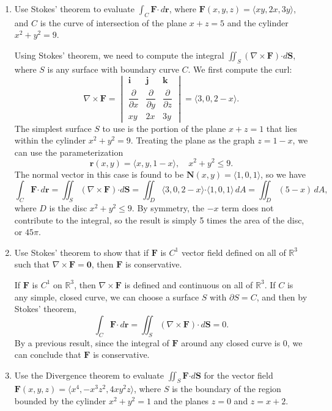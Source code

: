 \documentclass[letterpaper,12pt]{article}
\newcommand{\R}{\mathbb{R}}
\renewcommand{\i}{\mathbf{i}}
\renewcommand{\j}{\mathbf{j}}
\renewcommand{\k}{\mathbf{k}}
\newcommand{\pd}[2]{\dfrac{\partial #1}{\partial #2}}
\renewcommand{\r}{\mathbf{r}}
\newcommand{\dotp}{\boldsymbol{\cdot}}
\newcommand{\F}{\mathbf{F}}
\renewcommand{\S}{\mathbf{S}}
\newcommand{\N}{\mathbf{N}}
\begin{document}
\begin{enumerate}
 \item Use Stokes' theorem to evaluate $\int_C\F\dotp \,d\r$, where $\F(x,y,z) = \langle xy, 2x, 3y\rangle$, and $C$ is the curve of intersection of the plane $x+z=5$ and the cylinder $x^2+y^2=9$.

\bigskip

Using Stokes' theorem, we need to compute the integral $\iint_S (\nabla\times \F)\dotp d\S$, where $S$ is any surface with boundary curve $C$. We first compute the curl:
\[
 \nabla \times \F = \begin{vmatrix}\i&\j&\k\\ \pd{}{x}&\pd{}{y}&\pd{}{z}\\xy& 2x& 3y\end{vmatrix} = \langle 3, 0, 2-x\rangle.
\]
The simplest surface $S$ to use is the portion of the plane $x+z=1$ that lies within the cylinder $x^2+y^2=9$. Treating the plane as the graph $z=1-x$, we can use the parameterization
\[
 \r(x,y) = \langle x, y, 1-x\rangle, \quad x^2+y^2\leq 9.
\]
The normal vector in this case is found to be $\N(x,y) = \langle 1, 0, 1\rangle$, so we have
\[
 \int_C\F\dotp\,d\r = \iint_S(\nabla\times\F)\dotp d\S = \iint_D\langle 3, 0, 2-x\rangle\dotp \langle 1, 0, 1\rangle\,dA = \iint_D(5-x)\,dA,
\]
where $D$ is the disc $x^2+y^2\leq 9$. By symmetry, the $-x$ term does not contribute to the integral, so the result is simply 5 times the area of the disc, or $45\pi$.

 \item Use Stokes' theorem to show that if $\F$ is $C^1$ vector field defined on all of $\R^3$ such that $\nabla\times \F = \mathbf{0}$, then $\F$ is conservative.

\bigskip

If $\F$ is $C^1$ on $\R^3$, then $\nabla\times \F$ is defined and continuous on all of $\R^3$. If $C$ is any simple, closed curve, we can choose a surface $S$ with $\partial S=C$, and then by Stokes' theorem,
\[
 \int_C \F\dotp\,d\r = \iint_S(\nabla\times \F)\dotp\,d\S = 0.
\]
By a previous result, since the integral of $\F$ around any closed curve is 0, we can conclude that $\F$ is conservative.

 \item Use the Divergence theorem to evaluate $\iint_S\F\dotp d\mathbf{S}$ for the vector field $\F(x,y,z) = \langle x^4,-x^3z^2, 4xy^2z\rangle$, where $S$ is the boundary of the region bounded by the cylinder $x^2+y^2=1$ and the planes $z=0$ and $z=x+2$.

\bigskip


\end{enumerate}
\end{document}
